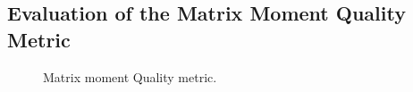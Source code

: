 
\subsection{Evaluation of the Matrix Moment Quality Metric}
\label{sxn:mm_quality}

\begin{figure}[h]
    \centering
    \hspace{1cm} %
    \caption{
        Matrix moment Quality metric.
    }
    \label{fig:FC1_quality}
\end{figure}

